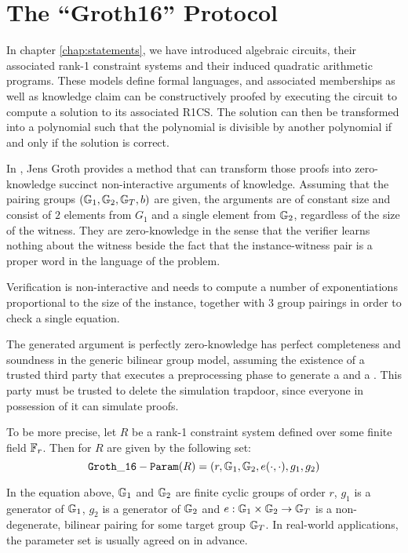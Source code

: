 \section{The ``Groth16'' Protocol} In chapter \ref{chap:statements}, we have introduced algebraic circuits, their associated rank-1 constraint systems and their induced quadratic arithmetic programs. These models define formal languages, and associated memberships as well as knowledge claim can be constructively proofed by executing the circuit to compute a solution to its associated R1CS. The solution can then be transformed into a polynomial such that  the polynomial is divisible by another polynomial if and only if the solution is correct. 
 
In \cite{Groth16}, Jens Groth provides a method that can transform those proofs into zero-knowledge succinct non-interactive arguments of knowledge. Assuming that the pairing groups $(\mathbb{G}_1,\mathbb{G}_2,\mathbb{G}_T,b)$ are given, the arguments are of constant size and consist of $2$ elements from $G_1$ and a single element from $\mathbb{G}_2$, regardless of the size of the witness. They are zero-knowledge in the sense that the verifier learns nothing about the witness beside the fact that the instance-witness pair is a proper word in the language of the problem.

Verification is non-interactive and needs to compute a number of exponentiations proportional to the size of the instance, together with $3$ group pairings in order to check a single equation.

The generated argument is perfectly zero-knowledge has perfect completeness and soundness in the generic bilinear group model, assuming the existence of a trusted third party that executes a preprocessing phase to generate a  and a . This party must be trusted to delete the simulation trapdoor, since everyone in possession of it can simulate proofs. 

To be more precise, let $R$ be a rank-1 constraint system defined over some finite field $\mathbb{F}_r$. Then  for $R$ are given by the following set:
\begin{equation}
\mathtt{Groth\_16-Param}(R)=(r, \mathbb{G}_1, \mathbb{G}_2, e(\cdot,\cdot), g_1,g_2)
\end{equation}

In the equation above, $\mathbb{G}_1$ and $\mathbb{G}_2$ are finite cyclic groups of order $r$, $g_1$ is a generator of $\mathbb{G}_1$, $g_2$ is a generator of $\mathbb{G}_2$ and $e: \mathbb{G}_1 \times \mathbb{G}_2 \to \mathbb{G}_T$ is a non-degenerate, bilinear pairing for some target group $\mathbb{G}_T$. In real-world applications, the parameter set is usually agreed on in advance. 

